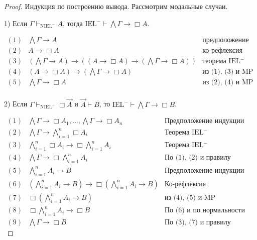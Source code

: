 \begin{proof}
Индукция по построению вывода. Рассмотрим модальные случаи.

\vspace{\baselineskip}

1) Если $\Gamma \vdash_{\text{NIEL}^{-}} A$, тогда $\text{IEL}^{-} \vdash \bigwedge \Gamma \rightarrow \Box A$.

$\begin{array}{lll}
(1) & \bigwedge \Gamma \rightarrow A & \text{предположение индукции}\\
(2) & A \rightarrow \Box A &\text{ко-рефлексия}\\
(3) & (\bigwedge \Gamma \rightarrow A) \rightarrow ((A \rightarrow \Box A) \rightarrow (\bigwedge \Gamma \rightarrow \Box A))&\text{теорема IEL$^{-}$}\\
(4) & (A \rightarrow \Box A) \rightarrow (\bigwedge \Gamma \rightarrow \Box A) &\text{из (1), (3) и MP}\\
(5) & \bigwedge \Gamma \rightarrow \Box A &\text{из (2), (4) и MP}\\
\end{array}$

\vspace{\baselineskip}

2) Если $\Gamma \vdash_{\text{NIEL}^{-}} \Box \vec{A}$ и $\vec{A} \vdash B$, то $\text{IEL}^{-} \vdash \bigwedge \Gamma \rightarrow \Box B$.

$\begin{array}{lll}
(1) &\bigwedge \Gamma \rightarrow \Box A_1, \dots, \bigwedge \Gamma \rightarrow \Box A_n& \text{Предположение индукции} \\
(2) &\bigwedge \Gamma \rightarrow \bigwedge \limits_{i = 1}^{n} \Box A_i & \text{Теорема IEL$^{-}$} \\
(3) &\bigwedge \limits_{i = 1}^{n} \Box A_i \rightarrow \Box \bigwedge \limits_{i = 1}^{n} A_i& \text{Теорема IEL$^{-}$} \\
(4) &\bigwedge \Gamma \rightarrow \Box \bigwedge \limits_{i = 1}^{n} A_i & \text{По (1), (2) и правилу силлогизма} \\
(5) &\bigwedge \limits_{i = 1}^{n} A_i \rightarrow B& \text{Предположение индукции} \\
(6) &(\bigwedge \limits_{i = 1}^{n} A_i \rightarrow B) \rightarrow \Box (\bigwedge \limits_{i = 1}^{n} A_i \rightarrow B)& \text{Ко-рефлексия}\\
(7) &\Box (\bigwedge \limits_{i = 1}^{n} A_i \rightarrow B)& \text{из (4), (5) и MP} \\
(8) &\Box \bigwedge \limits_{i = 1}^{n} A_i \rightarrow \Box B & \text{По (6) и по нормальности} \\
(9) &\bigwedge \Gamma \rightarrow \Box B & \text{По (3), (7) и правилу силлогизма}
\end{array}$

\end{proof}

